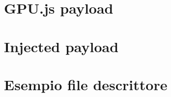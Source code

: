 \documentclass[conference, italian]{IEEEtran}
\begin{document}
\balance
\newpage
\printbibliography
\vspace{12pt}


\onecolumn
\begin{appendices}
\appendix
  \section*{GPU.js payload}\label{appendix:gpu-payload}
  

  \section*{Injected payload}\label{appendix:injected-payload}
  

  \section*{Esempio file descrittore}\label{appendix:descriptor-file}
  
\end{appendices}
\end{document}
